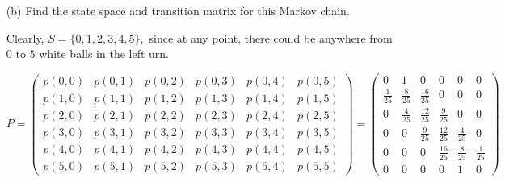 \documentclass[11pt]{article}
\begin{document}
\begin{problem}
\begin{enumerate}
\begin{solution}
    \end{solution}
    \item[(b)] Find the state space and transition matrix for this Markov chain.
    \begin{solution}
        Clearly, $S = \{0,1,2,3,4,5\},$ since at any point, there could be anywhere from $0$ to $5$ white balls in the left urn. 

        \[P = \begin{pmatrix}
            p(0,0) &p(0,1) & p(0,2) & p(0,3) & p(0,4) & p(0,5)\\
            p(1,0) & p(1,1) & p(1,2) & p(1,3) & p(1,4) & p(1,5)\\
            p(2,0) & p(2,1) & p(2,2) & p(2,3) & p(2,4) & p(2,5)\\
            p(3,0) & p(3,1) & p(3,2) & p(3,3) & p(3,4) & p(3,5)\\
            p(4,0) & p(4,1) & p(4,2) & p(4,3) & p(4,4) & p(4,5)\\
            p(5,0) & p(5,1) & p(5,2) & p(5,3) & p(5,4) & p(5,5)
        \end{pmatrix} = 
            \begin{pmatrix}
            0 &1 & 0 & 0 & 0 & 0\\
            \frac{1}{25} & \frac{8}{25}& \frac{16}{25} & 0 & 0 & 0\\
            0 & \frac{4}{25}  & \frac{12}{25} & \frac{9}{25} & 0 & 0\\
            0 & 0 & \frac{9}{25} & \frac{12}{25} & \frac{4}{25} &0\\
            0 & 0 & 0 & \frac{16}{25} & \frac{8}{25} & \frac{1}{25}\\
            0 & 0 & 0 & 0 & 1 & 0
        \end{pmatrix}\]
    \end{solution}
\end{enumerate}

\end{problem}

\newpage
\end{document}
